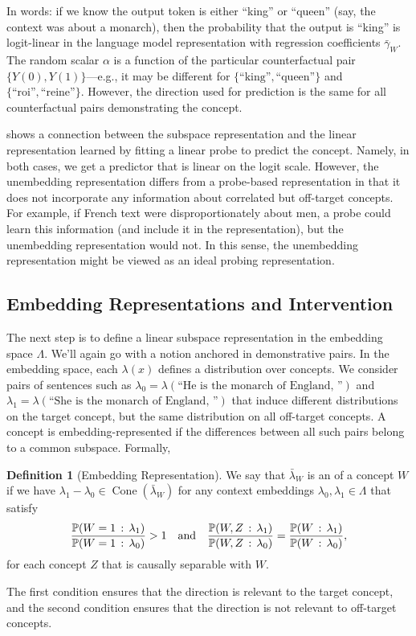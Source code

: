 \documentclass{article}
\theoremstyle{plain}
\theoremstyle{definition}
\newtheorem{definition}[theorem]{Definition}
\theoremstyle{remark}
\DeclareMathOperator{\ConeOp}{Cone}
\newcommand{\Cone}[1]{\ConeOp(#1)}
\begin{document}
In words: if we know the output token is either ``king'' or ``queen'' (say, the context was about a monarch), then the probability that the output is ``king'' is logit-linear in the language model representation with regression coefficients $\bar{\gamma}_W$. 
The random scalar $\alpha$ is a function of the particular counterfactual pair $\{Y(0),Y(1)\}$---e.g., it may be different for $\{\text{``king''}, \text{``queen''}\}$ and $\{\text{``roi''}, \text{``reine''}\}$. However, the direction used for prediction is the same for all counterfactual pairs demonstrating the concept.

 shows a connection between the subspace representation and the linear representation learned by fitting a linear probe to predict the concept.
Namely, in both cases, we get a predictor that is linear on the logit scale. 
However, the unembedding representation differs from a probe-based representation in that it does not incorporate any information about correlated but off-target concepts. For example, if French text were disproportionately about men, a probe could learn this information (and include it in the representation), but the unembedding representation would not.
In this sense, the unembedding representation might be viewed as an ideal probing representation.

\subsection{Embedding Representations and Intervention}
The next step is to define a linear subspace representation in the embedding space $\Lambda$.
We'll again go with a notion anchored in demonstrative pairs.
In the embedding space, each $\lambda(x)$ defines a distribution over concepts.
We consider pairs of sentences such as $\lambda_0 = \lambda(\text{``He is the monarch of England, ''})$ and $\lambda_1 = \lambda(\text{``She is the monarch of England, ''})$ that induce different distributions on the target concept, but the same distribution on all off-target concepts. A concept is embedding-represented if the differences between all such pairs belong to a common subspace. Formally,
\begin{definition}
    [Embedding Representation]\label{def:embedding_rep}
    We say that $\bar{\lambda}_W$ is an  of a concept $W$ if we have
    $\lambda_1 - \lambda_0 \in \Cone{\bar{\lambda}_W}$ for any context embeddings $\lambda_0, \lambda_1 \in \Lambda$ that satisfy
    \begin{equation*}
        \frac{\Pr(W=1 \given \lambda_1)}{\Pr(W=1\given \lambda_0)} > 1 \quad\text{and}\quad \frac{\Pr(W,Z \given \lambda_1)}{\Pr(W, Z \given \lambda_0)} = \frac{\Pr(W \given \lambda_1)}{\Pr(W \given \lambda_0)},
    \end{equation*}
    for each concept $Z$ that is causally separable with $W$.
\end{definition} 
The first condition ensures that the direction is relevant to the target concept, and the second condition ensures that the direction is not relevant to off-target concepts.
\end{document}

